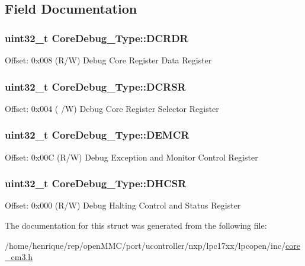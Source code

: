 \subsection{Field Documentation}
\hypertarget{structCoreDebug__Type_ab8f4bb076402b61f7be6308075a789c9}{
\subsubsection[{D\-C\-R\-D\-R}]{ uint32\-\_\-t Core\-Debug\-\_\-\-Type\-::\-D\-C\-R\-D\-R}}\label{structCoreDebug__Type_ab8f4bb076402b61f7be6308075a789c9}
Offset\-: 0x008 (R/\-W) Debug Core Register Data Register \hypertarget{structCoreDebug__Type_afefa84bce7497652353a1b76d405d983}{
\subsubsection[{D\-C\-R\-S\-R}]{ uint32\-\_\-t Core\-Debug\-\_\-\-Type\-::\-D\-C\-R\-S\-R}}\label{structCoreDebug__Type_afefa84bce7497652353a1b76d405d983}
Offset\-: 0x004 ( /\-W) Debug Core Register Selector Register \hypertarget{structCoreDebug__Type_a5cdd51dbe3ebb7041880714430edd52d}{
\subsubsection[{D\-E\-M\-C\-R}]{ uint32\-\_\-t Core\-Debug\-\_\-\-Type\-::\-D\-E\-M\-C\-R}}\label{structCoreDebug__Type_a5cdd51dbe3ebb7041880714430edd52d}
Offset\-: 0x00\-C (R/\-W) Debug Exception and Monitor Control Register \hypertarget{structCoreDebug__Type_a25c14c022c73a725a1736e903431095d}{
\subsubsection[{D\-H\-C\-S\-R}]{ uint32\-\_\-t Core\-Debug\-\_\-\-Type\-::\-D\-H\-C\-S\-R}}\label{structCoreDebug__Type_a25c14c022c73a725a1736e903431095d}
Offset\-: 0x000 (R/\-W) Debug Halting Control and Status Register 

The documentation for this struct was generated from the following file\-:\begin{DoxyCompactItemize}
\item 
/home/henrique/rep/open\-M\-M\-C/port/ucontroller/nxp/lpc17xx/lpcopen/inc/\hyperlink{core__cm3_8h}{core\-\_\-cm3.\-h}\end{DoxyCompactItemize}
